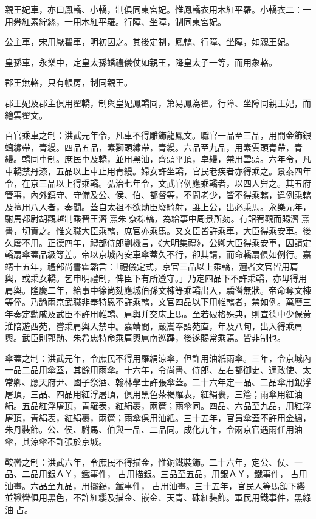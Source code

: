 親王妃車，亦曰鳳轎、小轎，制俱同東宮妃。惟鳳轎衣用木紅平羅。小轎衣二：一用礬紅素紵絲，一用木紅平羅。行障、坐障，制同東宮妃。

公主車，宋用厭翟車，明初因之。其後定制，鳳轎、行障、坐障，如親王妃。

皇孫車，永樂中，定皇太孫婚禮儀仗如親王，降皇太子一等，而用象輅。

郡王無輅，只有帳房，制同親王。

郡王妃及郡主俱用翟轎，制與皇妃鳳轎同，第易鳳為翟。行障、坐障同親王妃，而繪雲翟文。

百官乘車之制：洪武元年令，凡車不得雕飾龍鳳文。職官一品至三品，用間金飾銀螭繡帶，青縵。四品五品，素獅頭繡帶，青縵。六品至九品，用素雲頭青帶，青縵。轎同車制。庶民車及轎，並用黑油，齊頭平頂，皁縵，禁用雲頭。六年令，凡車轎禁丹漆，五品以上車止用青縵。婦女許坐轎，官民老疾者亦得乘之。景泰四年令，在京三品以上得乘轎。弘治七年令，文武官例應乘轎者，以四人舁之。其五府管事，內外鎮守、守備及公、侯、伯、都督等，不問老少，皆不得乘轎，違例乘轎及擅用八人者，奏聞。蓋自太祖不欲勛臣廢騎射，雖上公，出必乘馬。永樂元年，駙馬都尉胡觀越制乘晉王濟熹朱尞棕轎，為給事中周景所劾。有詔宥觀而賜濟熹書，切責之。惟文職大臣乘轎，庶官亦乘馬。又文臣皆許乘車，大臣得乘安車。後久廢不用。正德四年，禮部侍郎劉機言，《大明集禮》，公卿大臣得乘安車，因請定轎扇傘蓋品級等差。帝以京城內安車傘蓋久不行，卻其請，而命轎扇俱如例行。嘉靖十五年，禮部尚書霍韜言：「禮儀定式，京官三品以上乘轎，邇者文官皆用肩輿，或乘女轎。乞申明禮制，俾臣下有所遵守。」乃定四品下不許乘轎，亦毋得用肩輿。隆慶二年，給事中徐尚劾應城伯孫文棟等乘轎出入，驕僭無狀。帝命奪文棟等俸。乃諭兩京武職非奉特恩不許乘轎，文官四品以下用帷轎者，禁如例。萬曆三年奏定勳戚及武臣不許用帷轎、肩輿并交床上馬。至若破格殊典，則宣德中少保黃淮陪遊西苑，嘗乘肩輿入禁中。嘉靖間，嚴嵩奉詔苑直，年及八旬，出入得乘肩輿。武臣則郭勛、朱希忠特命乘肩輿扈南巡蹕，後遂賜常乘焉。皆非制也。

傘蓋之制：洪武元年，令庶民不得用羅絹涼傘，但許用油紙雨傘。三年，令京城內一品二品用傘蓋，其餘用雨傘。十六年，令尚書、侍郎、左右都御史、通政使、太常卿、應天府尹、國子祭酒、翰林學士許張傘蓋。二十六年定一品、二品傘用銀浮屠頂，三品、四品用紅浮屠頂，俱用黑色茶褐羅表，紅絹裹，三簷；雨傘用紅油絹。五品紅浮屠頂，青羅表，紅絹裹，兩簷；雨傘同。四品、六品至九品，用紅浮屠頂，青絹表，紅絹裹，兩簷；雨傘俱用油紙。三十五年，官員傘蓋不許用金繡，朱丹裝飾。公、侯、駙馬、伯與一品、二品同。成化九年，令兩京官遇雨任用油傘，其涼傘不許張於京城。

鞍轡之制：洪武六年，令庶民不得描金，惟銅鐵裝飾。二十六年，定公、侯、一品、二品用銀ＡＹ，鐵事件，占用描銀。三品至五品，用銀ＡＹ，鐵事件，占用油畫。六品至九品，用擺錫，鐵事件，占用油畫。三十五年，官民人等馬頷下纓並鞦轡俱用黑色，不許紅纓及描金、嵌金、天青、硃紅裝飾。軍民用鐵事件，黑綠油占。

